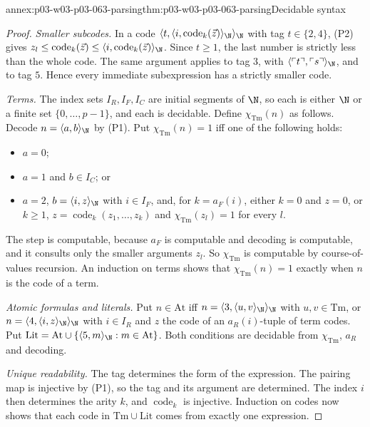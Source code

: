 \begin{annexitem}{annex:p03-w03-p03-063-parsing}{thm:p03-w03-p03-063-parsing}{Decidable syntax}
\begin{proof}
\emph{Smaller subcodes.}  In a code
\(\langle t,\langle i,\operatorname{code}_k(\vec z)\rangle_{\N}\rangle_{\N}\)
with tag \(t\in\{2,4\}\), (P2) gives
\(z_l\leq\operatorname{code}_k(\vec z)\leq\langle i,\operatorname{code}_k(\vec z)\rangle_{\N}\).
Since \(t\geq1\), the last number is strictly less than the whole code.  The
same argument applies to tag \(3\), with \(\langle\ulcorner t\urcorner,\ulcorner s\urcorner\rangle_{\N}\),
and to tag \(5\).  Hence every immediate subexpression has a strictly smaller
code.

\emph{Terms.}  The index sets \(I_R,I_F,I_C\) are initial segments of \(\N\),
so each is either \(\N\) or a finite set \(\{0,\ldots,p-1\}\), and each is
decidable.  Define \(\chi_{\mathrm{Tm}}(n)\) as follows.  Decode
\(n=\langle a,b\rangle_{\N}\) by (P1).  Put \(\chi_{\mathrm{Tm}}(n)=1\) iff
one of the following holds:
\begin{itemize}
\item \(a=0\);
\item \(a=1\) and \(b\in I_C\); or
\item \(a=2\), \(b=\langle i,z\rangle_{\N}\) with \(i\in I_F\), and, for
  \(k=a_F(i)\), either \(k=0\) and \(z=0\), or \(k\geq1\),
  \(z=\operatorname{code}_k(z_1,\ldots,z_k)\) and
  \(\chi_{\mathrm{Tm}}(z_l)=1\) for every \(l\).
\end{itemize}
The step is computable, because \(a_F\) is computable and decoding is
computable, and it consults only the smaller arguments \(z_l\).  So
\(\chi_{\mathrm{Tm}}\) is computable by course-of-values recursion.  An
induction on terms shows that \(\chi_{\mathrm{Tm}}(n)=1\) exactly when \(n\)
is the code of a term.

\emph{Atomic formulas and literals.}  Put \(n\in\mathrm{At}\) iff
\(n=\langle3,\langle u,v\rangle_{\N}\rangle_{\N}\) with \(u,v\in\mathrm{Tm}\),
or \(n=\langle4,\langle i,z\rangle_{\N}\rangle_{\N}\) with \(i\in I_R\) and
\(z\) the code of an \(a_R(i)\)-tuple of term codes.  Put
\(\mathrm{Lit}=\mathrm{At}\cup\{\langle5,m\rangle_{\N}:m\in\mathrm{At}\}\).
Both conditions are decidable from \(\chi_{\mathrm{Tm}}\), \(a_R\) and
decoding.

\emph{Unique readability.}  The tag determines the form of the expression.
The pairing map is injective by (P1), so the tag and its argument are
determined.  The index \(i\) then determines the arity \(k\), and
\(\operatorname{code}_k\) is injective.  Induction on codes now shows that
each code in \(\mathrm{Tm}\cup\mathrm{Lit}\) comes from exactly one
expression.


\end{proof}
\end{annexitem}

